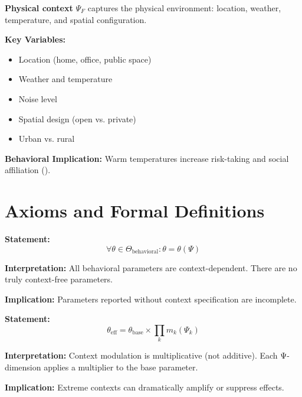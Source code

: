 \begin{definition}
\textbf{Physical context} $\Psi_F$ captures the physical environment:
location, weather, temperature, and spatial configuration.
\end{definition}

\textbf{Key Variables:}
\begin{itemize}[nosep]
\item Location (home, office, public space)
\item Weather and temperature
\item Noise level
\item Spatial design (open vs. private)
\item Urban vs. rural
\end{itemize}

\textbf{Behavioral Implication:}
Warm temperatures increase risk-taking and social affiliation
(\citet{huang2014warm}).


\section{Axioms and Formal Definitions}
\label{sec:when-axioms}

\begin{tcolorbox}[colback=gray!5!white, colframe=gray!75!black,
    title=Axiom PSI-1: Universal Context Dependence]
\textbf{Statement:}
\begin{equation}
\forall \theta \in \Theta_{\text{behavioral}}: \theta = \theta(\Psi)
\end{equation}

\textbf{Interpretation:} All behavioral parameters are context-dependent.
There are no truly context-free parameters.

\textbf{Implication:} Parameters reported without context specification are incomplete.
\end{tcolorbox}

\begin{tcolorbox}[colback=gray!5!white, colframe=gray!75!black,
    title=Axiom PSI-2: Multiplicative Modulation]
\textbf{Statement:}
\begin{equation}
\theta_{\text{eff}} = \theta_{\text{base}} \times \prod_{k} m_k(\Psi_k)
\label{eq:when-modulation-axiom}
\end{equation}

\textbf{Interpretation:} Context modulation is multiplicative (not additive).
Each Ψ-dimension applies a multiplier to the base parameter.

\textbf{Implication:} Extreme contexts can dramatically amplify or suppress effects.
\end{tcolorbox}

